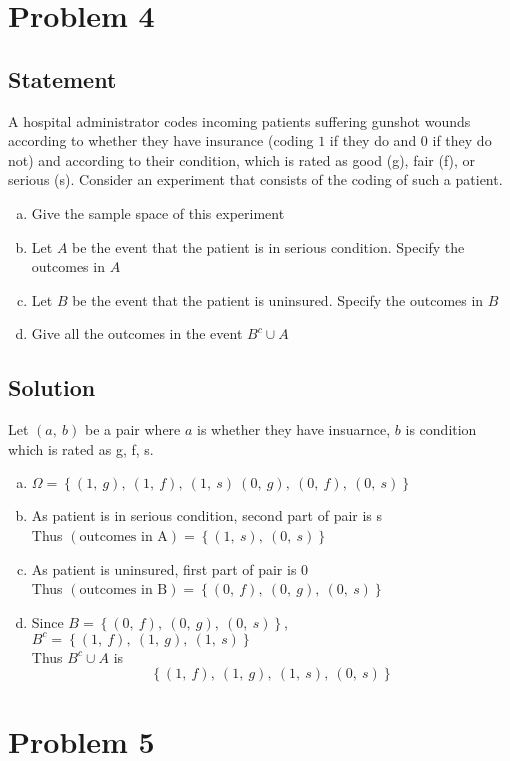 \documentclass[12pt]{article}
\theoremstyle{plain}
\begin{document}
\section*{Problem 4}
\subsection*{Statement}
A hospital administrator codes incoming patients suffering gunshot wounds according to whether they have insurance (coding $1$ if they do and $0$ if they do not) and according to their condition, which is rated as good (g), fair (f), or serious (s). Consider an experiment that consists of the coding of such a patient.
\begin{enumerate}[(a)]
	\item Give the sample space of this experiment
	\item Let $A$ be the event that the patient is in serious condition. Specify the outcomes in $A$
	\item Let $B$ be the event that the patient is uninsured. Specify the outcomes in $B$
	\item Give all the outcomes in the event $B^c\cup A$
\end{enumerate}
\subsection*{Solution}
	Let $(a,~b)$ be a pair where $a$ is whether they have insuarnce, $b$ is condition which is rated as g, f, s.
\begin{enumerate}[(a)]
		\item $\Omega=\left\{(1,~g),~(1,~f),~(1,~s)~(0,~g),~(0,~f),~(0,~s)\right\}$
		\item As patient is in serious condition, second part of pair is s
		\\ Thus $(\text{outcomes in A})=\left\{(1,~s),~(0,~s)\right\}$
		\item As patient is uninsured, first part of pair is $0$
		\\ Thus $(\text{outcomes in B})=\left\{(0,~f),~(0,~g),~(0,~s)\right\}$
		\item Since $B=\left\{(0,~f),~(0,~g),~(0,~s)\right\}$, $B^c=\left\{(1,~f),~(1,~g),~(1,~s)\right\}$
		\\ Thus $B^c\cup A$ is
		$$\left\{(1,~f),~(1,~g),~(1,~s),~(0,~s)\right\}$$
\end{enumerate}

\newpage
\section*{Problem 5}
\end{document}

